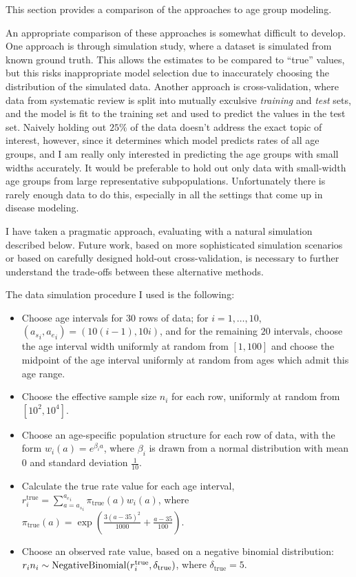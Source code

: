 This section provides a comparison of the approaches to age group
modeling.

An appropriate comparison of these approaches is somewhat difficult to
develop.  One approach is through simulation study, where a dataset is
simulated from known ground truth.  This allows the estimates to be
compared to ``true'' values, but this risks
inappropriate model selection due to inaccurately choosing the
distribution of the simulated data.  Another approach is
cross-validation, where data from systematic review is split into
mutually exculsive
\emph{training} and \emph{test} sets, and the model is fit to the
training set and used to predict the values in the test set.  Naively
holding out $25\%$ of the data doesn't address the exact topic of
interest, however, since it determines which model predicts rates of
all age groups, and I am really only interested in predicting the age
groups with small widths accurately.  It would be preferable to hold
out only data with small-width age groups from large representative
subpopulations.  Unfortunately there is rarely enough data to do this,
especially in all the settings that come up in disease modeling.

I have taken a pragmatic approach, evaluating with a natural
simulation described below.  Future work, based on more sophisticated
simulation scenarios or based on carefully designed hold-out
cross-validation, is necessary to further understand the trade-offs
between these alternative methods.

The data simulation procedure I used is the following:
\begin{itemize}
\item Choose age intervals for $30$ rows of data; for $i=1,\ldots,10$,
  $({a_s}_i,{a_e}_i) = (10(i-1), 10i)$, and for the remaining $20$
  intervals, choose the age interval width uniformly at random from $[1,100]$
  and choose the midpoint of the age interval uniformly at random from ages
  which admit this age range.

\item Choose the effective sample size $n_i$ for each row, uniformly at random from $[10^2, 10^4]$.

\item Choose an age-specific population structure for each row of data,
  with the form $w_i(a) = e^{\beta_i a}$, where $\beta_i$ is drawn
  from a normal distribution with mean $0$ and standard deviation
  $\frac{1}{10}$.

\item Calculate the true rate value for each age interval,
  $r^\text{true}_i = \sum_{a={a_s}_i}^{{a_e}_i} \pi_\text{true}(a)
  w_i(a)$, where $\pi_\text{true}(a) =
  \exp\left(\frac{3(a-35)^2}{1000} + \frac{a-35}{100}\right).$

\item Choose an observed rate value, based on a negative binomial distribution:
$r_in_i \sim \operatorname{NegativeBinomial}(r^\text{true}_i, \delta_\text{true})$, where $\delta_\text{true} = 5$.
\end{itemize}

